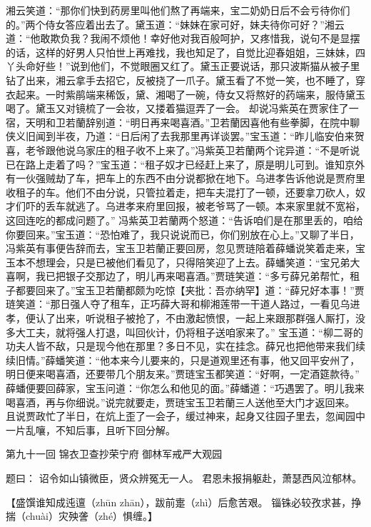 \documentclass[12pt,oneside]{book}
\begin{document}
湘云笑道：“那你们快到药房里叫他们熬了再端来，宝二奶奶日后不会亏待你们的。”两个侍女答应着出去了。黛玉道：“妹妹在家可好，妹夫待你可好？”湘云道：“他敢欺负我？我闹不烦他！幸好他对我百般呵护，又疼惜我，说句不是显摆的话，这样的好男人只怕世上再难找，我也知足了，自觉比迎春姐姐，三妹妹，四丫头命好些！”说到他们，不觉眼圈又红了。黛玉正要说话，那只波斯猫从被子里钻了出来，湘云拿手去招它，反被挠了一爪子。黛玉看了不觉一笑，也不睡了，穿衣起来。一时紫鹃端来稀饭，黛、湘喝了一碗，侍女又将熬好的药端来，服侍黛玉喝了。黛玉又对镜梳了一会妆，又搂着猫逗弄了一会。
却说冯紫英在贾家住了一宿，天明和卫若蘭辞别道：“明日再来喝喜酒。”卫若蘭因喜他有些拳脚，在院中聊侠义旧闻到半夜，乃道：“日后闲了去我那里再详谈罢。”宝玉道：“昨儿临安伯来贺喜，老爷跟他说乌家庄的租子收不上来了。”冯紫英卫若蘭两个诧异道：“不是听说已在路上走着了吗？”宝玉道：“租子奴才已经赶上来了，原是明儿可到。谁知京外有一伙强贼劫了车，把车上的东西不由分说都掀在地下。乌进孝告诉他说是贾府里收租子的车。他们不由分说，只管拉着走，把车夫混打了一顿，还要拿刀砍人，奴才们吓的丢车就逃了。乌进孝来府里回报，被老爷骂了一顿。本来家里就不宽裕，这回连吃的都成问题了。”
冯紫英卫若蘭两个怒道：“告诉咱们是在那里丢的，咱给你要回来。”宝玉道：“恐怕难了，我只说说而已，你们别放在心上。”又聊了半日，冯紫英有事便告辞而去，宝玉卫若蘭正要回房，忽见贾琏陪着薛蟠说笑着走来，宝玉本不想理会，只是已被他们看见了，只得陪笑迎了上去。薛蟠笑道：“宝兄弟大喜啊，我已把银子交那边了，明儿再来喝喜酒。”贾琏笑道：“多亏薛兄弟帮忙，租子都要回来了。”宝玉卫若蘭都颇为吃惊【夹批：吾亦纳罕】道：“薛兄好本事！”贾琏笑道：“那日强人夺了租车，正巧薛大哥和柳湘莲带一干道人路过，一看见乌进孝，便认了出来，听说租子被抢了，不由激起愤恨，一起上来跟那群强人厮打，没多大工夫，就将强人打退，叫回伙计，仍将租子送咱家来了。”
宝玉道：“柳二哥的功夫人皆不敌，只是现今他在那里？多日不见，实在挂念。薛兄也把他带来我们续续旧情。”薛蟠笑道：“他本来今儿要来的，只是道观里还有事，他又回平安州了，明日便来喝喜酒，还要带几个朋友来。”贾琏宝玉都笑道：“好啊，一定酒筵款待。”
薛蟠便要回薛家，宝玉问道：“你怎么和他见的面。”薛蟠道：“巧遇罢了。明儿我来喝喜酒，再与你细说。”说完就要走，贾琏宝玉卫若蘭三人送他至大门才返回来。
且说贾政忙了半日，在炕上歪了一会子，缓过神来，起身又往园子里去，忽闻园中一片乱嚷，不知后事，且听下回分解。


 
第九十一回 锦衣卫查抄荣宁府 御林军戒严大观园 

题曰：
诏令如山镇微臣，贤众辨冤无一人。
君恩未报捐躯赴，萧瑟西风泣郁林。

【盛馔谁知成迍邅（zhūn zhān），跋前疐（zhì）后愈苦艰。
锱铢必较孜求甚，挣揣（chuài）灾殃詟（zhé）惧缠。】
\end{document}
